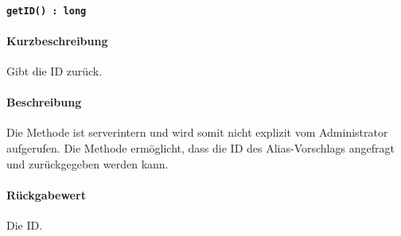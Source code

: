 \paragraph{\texttt{getID() : long}}%
\paragraph*{Kurzbeschreibung}
Gibt die ID zurück.
\paragraph*{Beschreibung}
Die Methode ist serverintern und wird somit nicht explizit vom Administrator aufgerufen.
Die Methode ermöglicht, dass die ID des Alias-Vorschlags angefragt und zurückgegeben werden kann.
\paragraph*{Rückgabewert}
Die ID.
